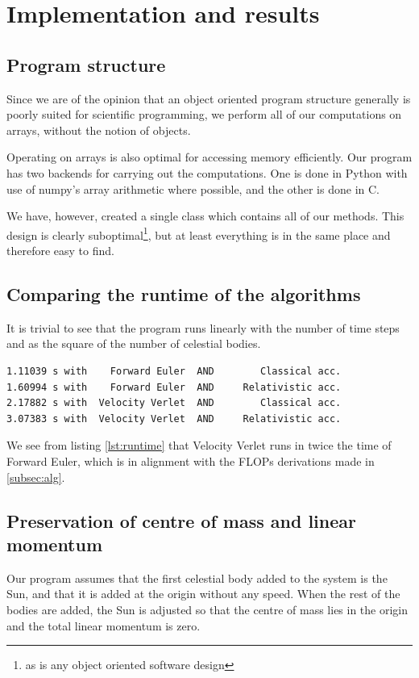 \documentclass[a4paper]{article}
\begin{document}
\section{Implementation and results}\label{sec:implementation_and_results}
\subsection{Program structure}
Since we are of the opinion that an object oriented program structure generally is poorly suited for scientific programming, we perform all of our computations on arrays, without the notion of objects.

Operating on arrays is also optimal for accessing memory efficiently. Our program has two backends for carrying out the computations. One is done in Python with use of numpy's array arithmetic where possible, and the other is done in C.

We have, however, created a single class which contains all of our methods. This design is clearly suboptimal\footnote{as is any object oriented software design}, but at least everything is in the same place and therefore easy to find.

\subsection{Comparing the runtime of the algorithms}
It is trivial to see that the program runs linearly with the number of time steps and as the square of the number of celestial bodies.

\begin{lstlisting}[basicstyle=\footnotesize, frame=single, label={lst:runtime},caption=Runtime for various combinations of algorithms]
1.11039 s with    Forward Euler  AND        Classical acc.
1.60994 s with    Forward Euler  AND     Relativistic acc.
2.17882 s with  Velocity Verlet  AND        Classical acc.
3.07383 s with  Velocity Verlet  AND     Relativistic acc.
\end{lstlisting}

We see from listing \ref{lst:runtime} that Velocity Verlet runs in twice the time of Forward Euler, which is in alignment with the FLOPs derivations made in \vref{subsec:alg}.


\subsection{Preservation of centre of mass and linear momentum}
Our program assumes that the first celestial body added to the system is the Sun, and that it is added at the origin without any speed. When the rest of the bodies are added, the Sun is adjusted so that the centre of mass lies in the origin and the total linear momentum is zero.
\end{document}
